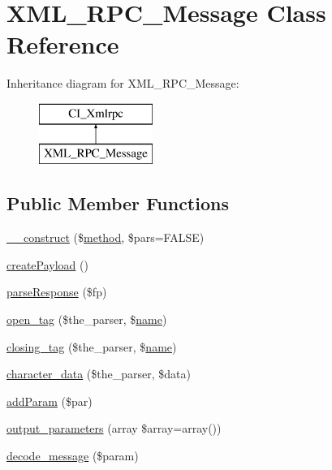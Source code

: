\hypertarget{class_x_m_l___r_p_c___message}{}\section{X\+M\+L\+\_\+\+R\+P\+C\+\_\+\+Message Class Reference}
\label{class_x_m_l___r_p_c___message}
Inheritance diagram for X\+M\+L\+\_\+\+R\+P\+C\+\_\+\+Message\+:\begin{figure}[H]
\begin{center}
\leavevmode
\includegraphics[height=2.000000cm]{class_x_m_l___r_p_c___message}
\end{center}
\end{figure}
\subsection*{Public Member Functions}
\begin{DoxyCompactItemize}
\item 
\mbox{\hyperlink{class_x_m_l___r_p_c___message_a099ea001f597681d3e5d9004923ccbcf}{\+\_\+\+\_\+construct}} (\$\mbox{\hyperlink{class_c_i___xmlrpc_a3d7e090549ec52eba8cf65598eefa72c}{method}}, \$pars=F\+A\+L\+SE)
\item 
\mbox{\hyperlink{class_x_m_l___r_p_c___message_a9db0a53d149ebbb907ef60a27bbc9f1c}{create\+Payload}} ()
\item 
\mbox{\hyperlink{class_x_m_l___r_p_c___message_ab1b93386615fce804baf236bf660a646}{parse\+Response}} (\$fp)
\item 
\mbox{\hyperlink{class_x_m_l___r_p_c___message_a7709ec5b6f0e3769592f8afdc23b9169}{open\+\_\+tag}} (\$the\+\_\+parser, \$\mbox{\hyperlink{waiter_2order_8php_afb270cde4944e425a37cf277116a7f43}{name}})
\item 
\mbox{\hyperlink{class_x_m_l___r_p_c___message_a6f0fbd9812fbf30516fa22d5743d9e89}{closing\+\_\+tag}} (\$the\+\_\+parser, \$\mbox{\hyperlink{waiter_2order_8php_afb270cde4944e425a37cf277116a7f43}{name}})
\item 
\mbox{\hyperlink{class_x_m_l___r_p_c___message_ae10d173fc93c23cb233ff01acb2afbe2}{character\+\_\+data}} (\$the\+\_\+parser, \$data)
\item 
\mbox{\hyperlink{class_x_m_l___r_p_c___message_a8000e3ae75e90052e5ee10febb9ce2d0}{add\+Param}} (\$par)
\item 
\mbox{\hyperlink{class_x_m_l___r_p_c___message_a763d97af7e5ff17493db7ecbd1064ba9}{output\+\_\+parameters}} (array \$array=array())
\item 
\mbox{\hyperlink{class_x_m_l___r_p_c___message_a76c958448d4b6569bfab9bfd2fb3dff0}{decode\+\_\+message}} (\$param)
\end{DoxyCompactItemize}
